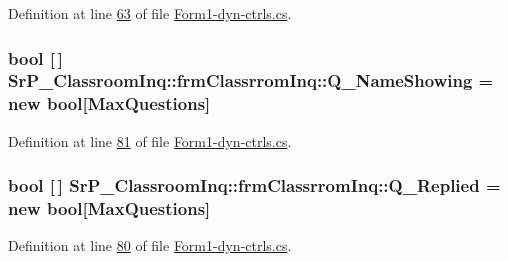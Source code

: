 \-Definition at line \hyperlink{_form1-dyn-ctrls_8cs_source_l00063}{63} of file \hyperlink{_form1-dyn-ctrls_8cs_source}{\-Form1-\/dyn-\/ctrls.\-cs}.

\hypertarget{class_sr_p___classroom_inq_1_1frm_classrrom_inq_a717931be8f79e53cf69e10515df3115e}{
\subsubsection[{\-Q\-\_\-\-Name\-Showing}]{\setlength{\rightskip}{0pt plus 5cm}bool \mbox{[}$\,$\mbox{]} {\bf \-Sr\-P\-\_\-\-Classroom\-Inq\-::frm\-Classrrom\-Inq\-::\-Q\-\_\-\-Name\-Showing} = new bool\mbox{[}{\bf \-Max\-Questions}\mbox{]}}}
\label{class_sr_p___classroom_inq_1_1frm_classrrom_inq_a717931be8f79e53cf69e10515df3115e}


\-Definition at line \hyperlink{_form1-dyn-ctrls_8cs_source_l00081}{81} of file \hyperlink{_form1-dyn-ctrls_8cs_source}{\-Form1-\/dyn-\/ctrls.\-cs}.

\hypertarget{class_sr_p___classroom_inq_1_1frm_classrrom_inq_af7c089d129d15a45c05bede3e9554f58}{
\subsubsection[{\-Q\-\_\-\-Replied}]{\setlength{\rightskip}{0pt plus 5cm}bool \mbox{[}$\,$\mbox{]} {\bf \-Sr\-P\-\_\-\-Classroom\-Inq\-::frm\-Classrrom\-Inq\-::\-Q\-\_\-\-Replied} = new bool\mbox{[}{\bf \-Max\-Questions}\mbox{]}}}
\label{class_sr_p___classroom_inq_1_1frm_classrrom_inq_af7c089d129d15a45c05bede3e9554f58}


\-Definition at line \hyperlink{_form1-dyn-ctrls_8cs_source_l00080}{80} of file \hyperlink{_form1-dyn-ctrls_8cs_source}{\-Form1-\/dyn-\/ctrls.\-cs}.

